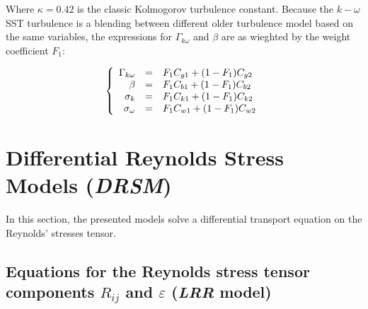 Where $\kappa = 0.42$ is the classic Kolmogorov turbulence constant. Because the $k-\omega$ SST turbulence is a blending between different older turbulence model based on the same variables, the expressions for $\Gamma_{k\omega}$ and $\beta$ are as wieghted by the weight coefficient $F_1$:

\begin{equation}
\left\{
\begin{array}{r c l}
\Gamma_{k\omega} & = & F_1 C_{g1} + (1-F_1) C_{g2}\\
\beta & = & F_1 C_{b1} + (1-F_1) C_{b2}\\
\sigma_k & = & F_1 C_{k1} + (1-F_1) C_{k2}\\
\sigma_\omega & = & F_1 C_{w1} + (1-F_1) C_{w2}
\end{array}
\right.
\end{equation}

\section{Differential Reynolds Stress Models (\emph{DRSM})}
In this section, the presented models solve a differential transport equation
on the Reynolds' stresses tensor.
\subsection{Equations for the Reynolds stress tensor components $R_{ij}$
and $\varepsilon$ (\emph{LRR} model)}

\hypertarget{rijeps}{}
%

